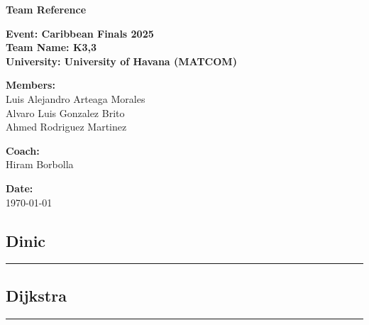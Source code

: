 \documentclass{article}
\begin{document}
\begin{landscape}
\begin{titlepage}
    \centering
    \vspace*{1in}
    
    \Huge
    \textbf{Team Reference}
    
    \vspace{0.5in}
    \LARGE
    \textbf{Event: Caribbean Finals 2025} \\
    [0.5cm]
    \textbf{Team Name: K3,3} \\
    [0.5cm]
    \textbf{University: University of Havana (MATCOM)} \\
    
    \vfill
    
    \Large
    \textbf{Members:} \\
    Luis Alejandro Arteaga Morales \\
    Alvaro Luis Gonzalez Brito \\
    Ahmed Rodriguez Martinez \\
    
    \vspace{0.5in}
    
    \textbf{Coach:} \\
    Hiram Borbolla \\
    
    \vfill
    
    \vspace{0.5in}
    
    \Large
    \textbf{Date:} \\
    \today
    
\end{titlepage}

\newpage

\tableofcontents

\newpage

\setlength{\columnseprule}{0.4pt}
\begin{multicols}{2}
\subsection{Dinic}
\vspace{0.2cm}
\hrule

\subsection{Dijkstra}
\vspace{0.2cm}
\hrule


\end{multicols}
\end{landscape}
\end{document}

